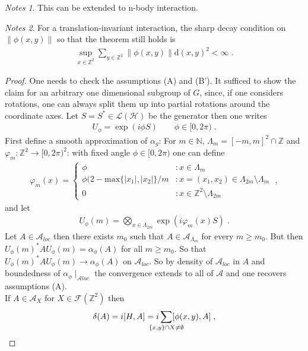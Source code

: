 \documentclass[
a4paper, %
11pt, %
onecolumn, %
openany, %
]{memoir}
\theoremstyle{definition}
\theoremstyle{remark}
\newtheorem{notes}{Notes}[chapter]
\theoremstyle{plain}
\begin{document}
\begin{notes}
This can be extended to n-body interaction.
\end{notes}
\begin{notes}
For a translation-invariant interaction, the sharp decay condition on $\|\phi(x,y)\|$ so that the theorem still holds is \begin{align}
\sup_{x\in\mathbb{Z}^2}\sum_{y\in\mathbb{Z}^2}\|\phi(x,y)\|\mathrm{d}(x,y)^2<\infty\; .
\end{align}
\end{notes}
\begin{proof}
One needs to check the assumptions (A) and (B'). It sufficed to show the claim for an arbitrary one dimensional subgroup of $G$, since, if one considers rotations, one can always split them up into partial rotations around the coordinate axes. Let $S=S^*\in\mathcal{L}(\mathcal{H})$ be the generator then one writes \begin{align}
U_{\phi}=\exp(i\phi S)\qquad \phi\in [0,2\pi)\; .
\end{align}
First define a smooth approximation of $\alpha_g$: For $m\in\mathbb{N}$, $\Lambda_{m}=[-m,m]^2\cap\mathbb{Z}$ and $\varphi_m:\mathbb{Z}^2\rightarrow[0,2\pi)^2$: with fixed angle $\phi\in[0,2\pi)$ one can define \begin{align}
\varphi_m(x)=\begin{cases}\phi & \colon x\in\Lambda_m \\
\phi(2-\mathrm{max}\{|x_1|,|x_2|\}/m&\colon x=(x_1,x_2)\in\Lambda_{2m}\setminus\Lambda_m\\
0 & \colon x\in \mathbb{Z}^2\setminus\Lambda_{2m} \end{cases}\; ,
\end{align}
and let \begin{align}
U_{\phi}(m)=\bigotimes_{x\in\Lambda_{2m}}\exp(i\varphi_m(x)S)\; .
\end{align}
Let $A\in\mathcal{A}_{loc}$ then there exists $m_0$ such that $A\in\mathcal{A}_{\Lambda_m}$ for every $m\geq m_0$. But then $U_{\phi}(m)^*AU_{\phi}(m)=\alpha_{\phi}(A)$ for all $m\geq m_0$. So that $U_{\phi}(m)^*AU_{\phi}(m)\rightarrow\alpha_{\phi}(A)$ on $\mathcal{A}_{loc}$. So by density of $\mathcal{A}_{loc}$ in $A$ and boundedness of $\alpha_{\phi}\mid_{\mathcal{A}{loc}}$ the convergence extends to all of $\mathcal{A}$ and one recovers assumptions (A).\\
If $A\in\mathcal{A}_X$ for $X\in\mathcal{F}(\mathbb{Z}^2)$ then \begin{align}
\delta(A)=i[H,A]=i\sum_{\mathclap{\{x,y\}\cap X\neq \emptyset}}[\phi(x,y),A]\; ,

\end{align}
\end{proof}
\end{document}
